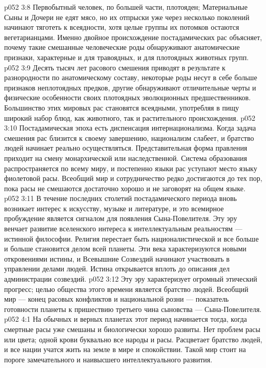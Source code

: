 \vs p052 3:8 \pc Первобытный человек, по большей части, плотояден; Материальные Сыны и Дочери не едят мясо, но их отпрыски уже через несколько поколений начинают тяготеть к всеядности, хотя целые группы их потомков остаются вегетарианцами. Именно двойное происхождение постадамических рас объясняет, почему такие смешанные человеческие роды обнаруживают анатомические признаки, характерные и для травоядных, и для плотоядных животных групп.
\vs p052 3:9 Десять тысяч лет расового смешения приводят в результате к разнородности по анатомическому составу, некоторые роды несут в себе больше признаков неплотоядных предков, другие обнаруживают отличительные черты и физические особенности своих плотоядных эволюционных предшественников. Большинство этих мировых рас становятся всеядными, употребляя в пищу широкий набор блюд, как животного, так и растительного происхождения.
\vs p052 3:10 \pc Постадамическая эпоха есть диспенсация интернационализма. Когда задача смешения рас близится к своему завершению, национализм слабеет, и братство людей начинает реально осуществляться. Представительная форма правления приходит на смену монархической или наследственной. Система образования распространяется по всему миру, и постепенно языки рас уступают место языку фиолетовой расы. Всеобщий мир и сотрудничество редко достигаются до тех пор, пока расы не смешаются достаточно хорошо и не заговорят на общем языке.
\vs p052 3:11 В течение последних столетий постадамического периода вновь возникает интерес к искусству, музыке и литературе, и это всемирное пробуждение является сигналом для появления Сына\hyp{}Повелителя. Эту эру венчает развитие вселенского интереса к интеллектуальным реальностям --- истинной философии. Религия перестает быть националистической и все больше и больше становится делом всей планеты. Эти века характеризуются новыми откровениями истины, и Всевышние Созвездий начинают участвовать в управлении делами людей. Истина открывается вплоть до описания дел администрации созвездий.
\vs p052 3:12 Эту эру характеризует огромный этический прогресс; целью общества этого времени является братство людей. Всеобщий мир --- конец расовых конфликтов и национальной розни --- показатель готовности планеты к пришествию третьего чина сыновства --- Сына\hyp{}Повелителя.
\vs p052 4:1 На обычных и верных планетах этот период начинается тогда, когда смертные расы уже смешаны и биологически хорошо развиты. Нет проблем расы или цвета; одной крови буквально все народы и расы. Расцветает братство людей, и все нации учатся жить на земле в мире и спокойствии. Такой мир стоит на пороге замечательного и наивысшего интеллектуального развития.
